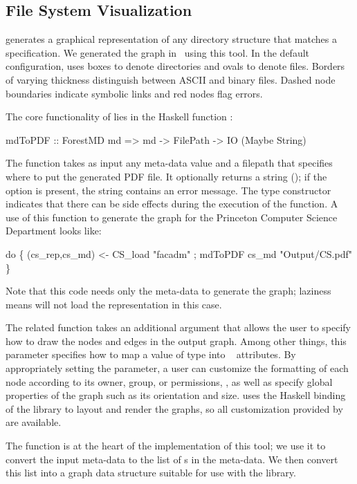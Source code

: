 \subsection{File System Visualization}
\fg{} generates a graphical representation of any directory structure
that matches a \forest{} specification.  We generated the graph in~ using  
this tool.  In the default configuration, \fg{} uses boxes to denote
directories and ovals to denote files. Borders of varying
thickness distinguish between ASCII and binary files.  
Dashed node boundaries indicate symbolic links and red nodes flag errors.

The core functionality of \fg{} lies in the Haskell function :
\begin{code}
mdToPDF :: ForestMD md => 
     md -> FilePath -> IO (Maybe String)
\end{code}
The function takes as input any meta-data value and a
filepath that specifies where to 
put the generated PDF file.  It optionally returns a string (); if the option is present, the string contains an error
message.  The  type constructor indicates that there can be
side effects during the execution of the function.  A use of
this function to generate the graph for the Princeton Computer Science
Department looks like:
\begin{code}
 do \{ (cs_rep,cs_md) <- CS_load  "facadm"
    ; mdToPDF cs_md "Output/CS.pdf"       \}
\end{code}
Note that this code needs only the meta-data to generate the graph;
laziness means \forest{} will not load the representation in this
case. 

The related function  takes an additional
argument that allows the user to specify how to draw the nodes and
edges in the output graph.  Among other things, this parameter
specifies how to map a value of type  into
\graphviz{}~\cite{haskell-graphviz,Gansner+:graphviz} attributes.  By appropriately setting the
parameter, a user can customize the formatting of each node according
to its owner, group, or permissions, \etc{}, as well as specify global
properties of the graph such as its orientation and size.  \fg{} uses
the Haskell binding of the \graphviz{} library to layout and render
the graphs, so all customization provided by \graphviz{} are
available.

The  function is at the heart of the implementation of
this tool; we use it to convert the input meta-data to the list of
s in the meta-data.  We then convert this list into a
graph data structure suitable for use with the \graphviz{} library.

